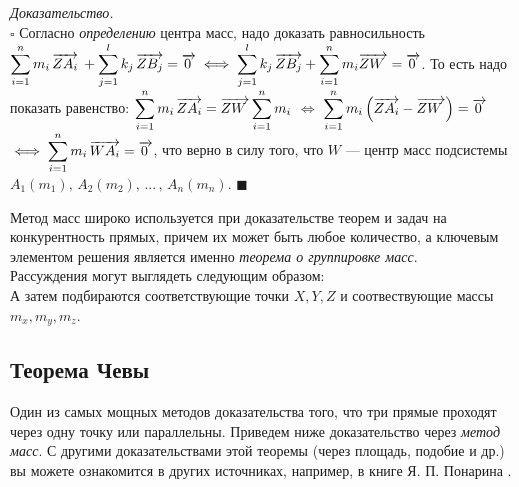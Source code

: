 \documentclass[14pt]{extarticle}
\let\Overrightarrow\overrightarrow
\let\vecarrow\overrightarrow
\theoremstyle{definition}
\theoremstyle{theorem}
\renewenvironment{proof}
    {\noindent \textit{Доказательство.}\\
	\indent $\square$}
	{ $\blacksquare$\\ }
\begin{document}
\begin{proof}
Согласно \textit{определению} центра масс, надо доказать равносильность\\
$\mathlarger{\sum_{i=1}^{n} m_i \, \Overrightarrow{ZA_i} \: + 
\sum_{j=1}^{l} k_j \, \Overrightarrow{ZB_j}} = \vecarrow{0_{\,}} \iff 
\mathlarger{\sum_{j=1}^{l} k_j \, \Overrightarrow{ZB_j} + 
	 \sum_{i=1}^{n} m_i  \Overrightarrow{ZW_{\: \,}}} = \vecarrow{0_{\,}}$.
То есть надо показать равенство:
$\mathlarger{\sum_{i=1}^{n} m_i \, \Overrightarrow{ZA_i} = 
\Overrightarrow{ZW_{\: \,}} \sum_{i=1}^{n} m_i}$ $\iff$   
$\mathlarger{\sum_{i=1}^{n}
m_i \, \Big(\Overrightarrow{ZA_i} - \Overrightarrow{ZW_{\: \,}}\Big)} = \vecarrow{0_{\,}}$ 
$\iff \mathlarger{\sum_{i=1}^{n}
m_i \, \Overrightarrow{WA_i}} = \vecarrow{0_{\,}}$, что верно в силу того, что $W$ ---
центр масс подсистемы $A_1(m_1), \, A_2(m_2), \, ... \, , \, A_n(m_n)$.
\end{proof}


Метод масс широко используется при доказательстве теорем и задач на
конкурентность прямых, причем их может быть любое количество, а ключевым 
элементом решения является именно \textit{теорема о группировке масс}.\\
Рассуждения могут выглядеть следующим образом:
\textit{}\\
А затем подбираются соответствующие точки \(X, Y, Z\) и соотвествующие 
массы \(m_x, m_y, m_z\).

\subsection{Теорема Чевы} 

\indent Один из самых мощных методов доказательства того, что три прямые 
проходят через одну точку или параллельны. 
Приведем ниже доказательство через \textit{метод масс}.
С другими доказательствами этой теоремы (через площадь, подобие и др.) 
вы можете ознакомится в других источниках, например, в книге Я. П. Понарина
.\\
\end{document}
